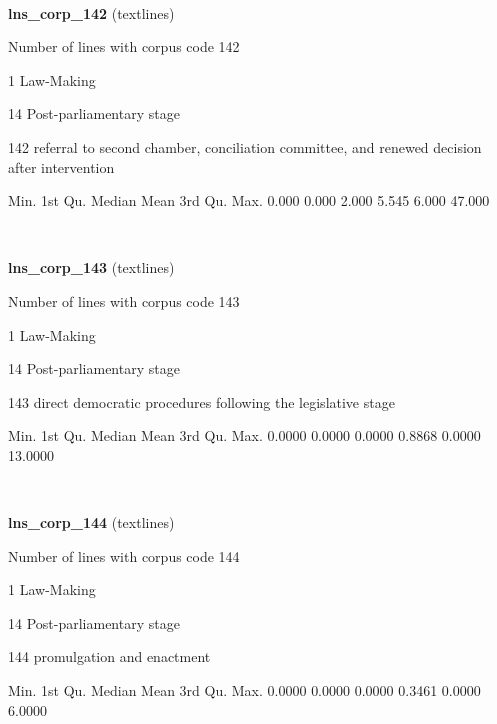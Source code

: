 \documentclass[]{article}
\newenvironment{Shaded}{\begin{snugshade}}{\end{snugshade}}
\newcommand{\FloatTok}[1]{\textcolor[rgb]{0.00,0.00,0.81}{{#1}}}
\newcommand{\NormalTok}[1]{{#1}}
\begin{document}
~

\vspace{1em}

\textbf{lns\_corp\_142} (textlines)

Number of lines with corpus code 142

1 Law-Making

14 Post-parliamentary stage

142 referral to second chamber, conciliation committee, and renewed
decision after intervention

\begin{Shaded}
\begin{Highlighting}[]
   \NormalTok{Min. 1st Qu.  Median    Mean 3rd Qu.    Max. }
  \FloatTok{0.000}   \FloatTok{0.000}   \FloatTok{2.000}   \FloatTok{5.545}   \FloatTok{6.000}  \FloatTok{47.000} 
\end{Highlighting}
\end{Shaded}

~

\vspace{1em}

\textbf{lns\_corp\_143} (textlines)

Number of lines with corpus code 143

1 Law-Making

14 Post-parliamentary stage

143 direct democratic procedures following the legislative stage

\begin{Shaded}
\begin{Highlighting}[]
   \NormalTok{Min. 1st Qu.  Median    Mean 3rd Qu.    Max. }
 \FloatTok{0.0000}  \FloatTok{0.0000}  \FloatTok{0.0000}  \FloatTok{0.8868}  \FloatTok{0.0000} \FloatTok{13.0000} 
\end{Highlighting}
\end{Shaded}

~

\vspace{1em}

\textbf{lns\_corp\_144} (textlines)

Number of lines with corpus code 144

1 Law-Making

14 Post-parliamentary stage

144 promulgation and enactment

\begin{Shaded}
\begin{Highlighting}[]
   \NormalTok{Min. 1st Qu.  Median    Mean 3rd Qu.    Max. }
 \FloatTok{0.0000}  \FloatTok{0.0000}  \FloatTok{0.0000}  \FloatTok{0.3461}  \FloatTok{0.0000}  \FloatTok{6.0000} 
\end{Highlighting}
\end{Shaded}
\end{document}
